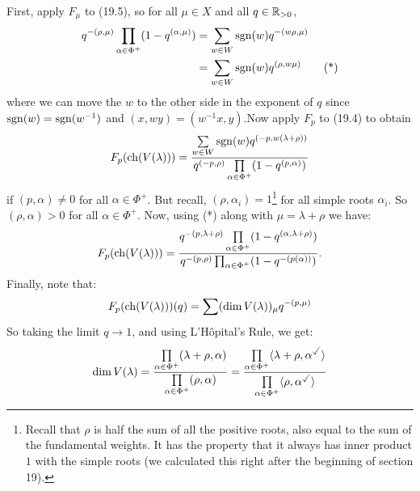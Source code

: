 \documentclass{article}
\begin{document}
First, apply $F_{\mu}$ to (19.5), so for all $\mu \in X$ and all $q \in \mathbb{R}_{>0}$, \begin{align*}
    q^{-(\rho, \mu)} \prod_{\alpha \in \Phi^{+}}(1-q^{(\alpha, \mu)}) &= \sum_{w \in W} \sgn(w)q^{-(w\rho, \mu)}\\
    &= \sum_{w \in W} \sgn(w) q^{(\rho, w\mu)} \tag{\text{*}}\\
\end{align*}
where we can move the $w$ to the other side in the exponent of $q$ since $\operatorname{sgn}(w) = \operatorname{sgn}(w^{-1})$ and $(x, wy) = (w^{-1}x,y)$.\gap Now apply $F_{p}$ to (19.4) to obtain \begin{align*}
    F_{p}(\operatorname{ch}(V(\lambda))) = \frac{\sum\limits_{w \in W} \operatorname{sgn}(w) q^{(-p, w(\lambda + \rho))}}{q^{(-p,\rho)} \prod\limits_{\alpha \in \Phi^{+}}(1-q^{(p, \alpha)})}
\end{align*}
if $(p,\alpha) \neq 0$ for all $\alpha \in \Phi^{+}$. But recall, $(\rho,\alpha_{i}) = 1$\footnote{Recall that $\rho$ is half the sum of all the positive roots, also equal to the sum of the fundamental weights. It has the property that it always has inner product $1$ with the simple roots (we calculated this right after the beginning of section 19).} for all simple roots $\alpha_{i}$. So $(\rho,\alpha)>0$ for all $\alpha \in \Phi^{+}$. Now, using (*) along with $\mu = \lambda + \rho$ we have: \begin{align*}
    F_{p}(\operatorname{ch}(V(\lambda))) = \frac{q^{-(p, \lambda + \rho)}\prod\limits_{\alpha \in \Phi^{+}}(1-q^{(\alpha, \lambda + \rho)}) } {q^{-(p,\rho)} \prod_{\alpha \in \Phi^{+}}(1-q^{-(p(\alpha))})}.
\end{align*}
Finally, note that: \[ F_{p}(\operatorname{ch}(V(\lambda)))(q) = \sum (\dim V(\lambda))_{\mu} q^{-(p,\mu)}\]
So taking the limit $q \to 1$, and using L'H\^opital's Rule, we get: \[ \dim V(\lambda) = \frac{\prod\limits_{\alpha \in \Phi^{+}}(\lambda + \rho, \alpha)}{\prod\limits_{\alpha \in \Phi^{+}} (\rho, \alpha)} 
= \frac{\prod\limits_{\alpha \in \Phi^{+}} \langle \lambda + \rho, \alpha^{\checked} \rangle} {\prod\limits_{\alpha \in \Phi^{+}} \langle \rho, \alpha^{\checked} \rangle} \]
\end{document}
